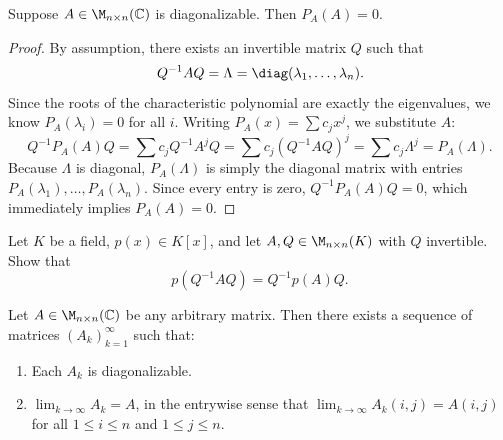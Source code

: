 \begin{lemma}
  \label{lemma:cayley_diagonalizable}
  Suppose $A \in \M_{n \times n}(\mathbb{C})$ is diagonalizable. Then $P_A(A) = 0$.
\end{lemma}

\begin{proof}
  By assumption, there exists an invertible matrix $Q$ such that 
  \[Q^{-1} A Q = \Lambda = \diag(\lambda_1, \dots, \lambda_n). \] 
  Since the roots of the characteristic polynomial are exactly the eigenvalues, we know $P_A(\lambda_i) = 0$ for all $i$. Writing $P_A(x) = \sum c_j x^j$, we substitute $A$:
  \[
  Q^{-1} P_A(A) Q = \sum c_j Q^{-1} A^j Q = \sum c_j (Q^{-1} A Q)^j = \sum c_j \Lambda^j = P_A(\Lambda).
  \]
  Because $\Lambda$ is diagonal, $P_A(\Lambda)$ is simply the diagonal matrix with entries $P_A(\lambda_1), \dots, P_A(\lambda_n)$. Since every entry is zero, $Q^{-1} P_A(A) Q = 0$, which immediately implies $P_A(A) = 0$.
\end{proof}

\begin{exercise}
  \label{exc:similarity_of_matrix_polynomials}
  Let $K$ be a field, $p(x) \in K[x]$, and let $A, Q \in \M_{n \times n}(K)$ with $Q$ invertible. Show that
  \[
  p(Q^{-1} A Q) = Q^{-1} p(A) Q.
  \]
\end{exercise}

\begin{lemma}
  \label{lemma:sequence_diagonalizable}
  Let $A \in \M_{n \times n}(\mathbb{C})$ be any arbitrary matrix. Then there exists a sequence of matrices $(A_k)_{k=1}^\infty$ such that:
  \begin{enumerate}[label=\textbf{(\alph*)}]
    \item Each $A_k$ is diagonalizable.
    \item $\lim_{k \to \infty} A_k = A$, in the entrywise sense that $\lim_{k \to \infty} A_k(i,j) = A(i,j)$ for all $1 \le i \le n$ and $1 \le j \le n$.
  \end{enumerate}
\end{lemma}

